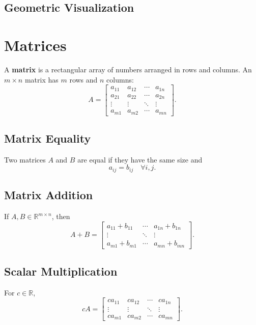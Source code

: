 \documentclass[a4paper,12pt]{article}
\begin{document}
\subsection{Geometric Visualization}
\begin{center}
\end{center}

\section{\Huge\textbf{Matrices}}
A \textbf{matrix} is a rectangular array of numbers arranged in rows and columns.  
An $m \times n$ matrix has $m$ rows and $n$ columns:
\[
A = \begin{bmatrix}
a_{11} & a_{12} & \cdots & a_{1n} \\
a_{21} & a_{22} & \cdots & a_{2n} \\
\vdots & \vdots & \ddots & \vdots \\
a_{m1} & a_{m2} & \cdots & a_{mn}
\end{bmatrix}.
\]

\subsection{Matrix Equality}
Two matrices $A$ and $B$ are equal if they have the same size and
\[
a_{ij} = b_{ij} \quad \forall i,j.
\]

\subsection{Matrix Addition}
If $A, B \in \mathbb{R}^{m \times n}$, then
\[
A + B = \begin{bmatrix}
a_{11} + b_{11} & \cdots & a_{1n} + b_{1n} \\
\vdots & \ddots & \vdots \\
a_{m1} + b_{m1} & \cdots & a_{mn} + b_{mn}
\end{bmatrix}.
\]

\subsection{Scalar Multiplication}
For $c \in \mathbb{R}$,
\[
cA = \begin{bmatrix}
ca_{11} & ca_{12} & \cdots & ca_{1n} \\
\vdots & \vdots & \ddots & \vdots \\
ca_{m1} & ca_{m2} & \cdots & ca_{mn}
\end{bmatrix}.
\]
\end{document}
